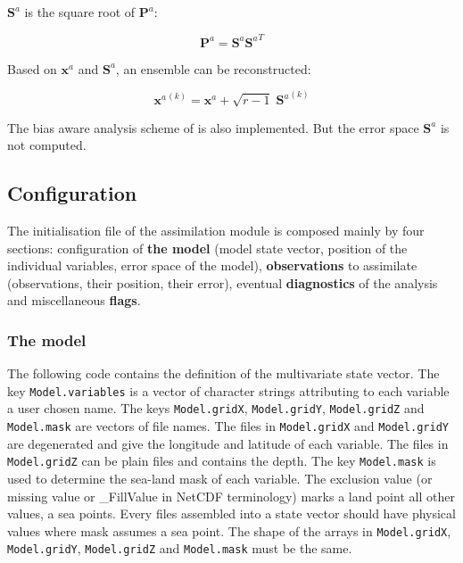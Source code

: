 \documentclass[a4paper,12pt]{article}
\newcommand{\code}{\texttt}
\begin{document}





 
$\mathbf S^a$ is the square root of $\mathbf P^a$:

\begin{equation}
\mathbf P^a = \mathbf S^a {\mathbf S^a}^T
\end{equation}

Based on $\mathbf x^a$ and $\mathbf S^a$, an ensemble can be reconstructed:

\begin{equation}
{\mathbf x^a}^{(k)} = \mathbf x^a + {\sqrt{r-1}} \; {\mathbf S^a}^{(k)}
\end{equation}

The bias aware analysis scheme of \citet{dee98} is also implemented. But the error space $\mathbf S^a$ is not computed.

\subsection{Configuration}\label{sec_config}

The initialisation file of the assimilation module is composed mainly
by four sections: configuration of \textbf{the model} (model state vector,
position of the individual variables, error space of the model),
\textbf{observations} to assimilate (observations, their position, their
error), eventual \textbf{diagnostics} of the analysis and
miscellaneous \textbf{flags}.

\subsubsection{The model}

The following code contains the definition of the multivariate state
vector. The key \code{Model.variables} is a vector of character
strings attributing to each variable a user chosen name. The keys
\code{Model.gridX}, \code{Model.gridY}, \code{Model.gridZ} and
\code{Model.mask} are vectors of file names. The files in \code{Model.gridX} and 
\code{Model.gridY} are degenerated and give the longitude and latitude
of each variable. The files in \code{Model.gridZ} can be plain files
and contains the depth. The key \code{Model.mask} is used to determine
the sea-land mask of each variable. The exclusion value (or missing
value or \_FillValue in NetCDF terminology) marks a land point all other values, a sea
points. Every files assembled into a state vector should have physical
values where mask assumes a sea point. The shape of the arrays in
\code{Model.gridX}, \code{Model.gridY}, \code{Model.gridZ} and
\code{Model.mask} must be the same. 
\\
\end{document}
